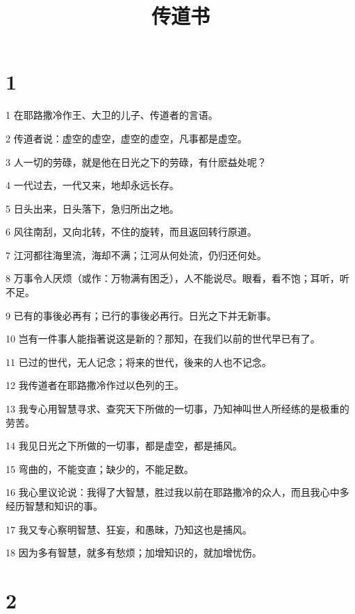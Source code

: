 

\title{传道书}


\chapter{1}

\par 1 在耶路撒冷作王、大卫的儿子、传道者的言语。
\par 2 传道者说：虚空的虚空，虚空的虚空，凡事都是虚空。
\par 3 人一切的劳碌，就是他在日光之下的劳碌，有什麽益处呢？
\par 4 一代过去，一代又来，地却永远长存。
\par 5 日头出来，日头落下，急归所出之地。
\par 6 风往南刮，又向北转，不住的旋转，而且返回转行原道。
\par 7 江河都往海里流，海却不满；江河从何处流，仍归还何处。
\par 8 万事令人厌烦（或作：万物满有困乏），人不能说尽。眼看，看不饱；耳听，听不足。
\par 9 已有的事後必再有；已行的事後必再行。日光之下并无新事。
\par 10 岂有一件事人能指著说这是新的？那知，在我们以前的世代早已有了。
\par 11 已过的世代，无人记念；将来的世代，後来的人也不记念。
\par 12 我传道者在耶路撒冷作过以色列的王。
\par 13 我专心用智慧寻求、查究天下所做的一切事，乃知神叫世人所经练的是极重的劳苦。
\par 14 我见日光之下所做的一切事，都是虚空，都是捕风。
\par 15 弯曲的，不能变直；缺少的，不能足数。
\par 16 我心里议论说：我得了大智慧，胜过我以前在耶路撒冷的众人，而且我心中多经历智慧和知识的事。
\par 17 我又专心察明智慧、狂妄，和愚昧，乃知这也是捕风。
\par 18 因为多有智慧，就多有愁烦；加增知识的，就加增忧伤。

\chapter{2}

